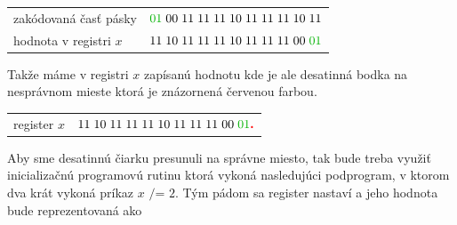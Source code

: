 \documentclass[11pt,a4paper]{article}
\newcommand{\red}[1]{\textcolor{red}{#1}}
\newcommand{\green}[1]{\textcolor{OliveGreen}{#1}}
\begin{document}
\begin{center}
    \begin{tabular}{l|l}
        zakódovaná časť pásky  & $\green{01} \hspace{1mm} 00 \hspace{1mm} 11 \hspace{1mm} 11 \hspace{1mm} 11 \hspace{1mm} 10 \hspace{1mm} 11 \hspace{1mm} 11 \hspace{1mm} 11 \hspace{1mm} 10 \hspace{1mm} 11$\\
        hodnota v registri $x$ & $11 \hspace{1mm} 10 \hspace{1mm} 11 \hspace{1mm} 11 \hspace{1mm} 11 \hspace{1mm} 10 \hspace{1mm} 11 \hspace{1mm} 11 \hspace{1mm} 11 \hspace{1mm} 00 \hspace{1mm} \green{01}$
    \end{tabular}
\end{center}

Takže máme v registri $x$ zapísanú hodnotu kde je ale desatinná bodka na nesprávnom mieste ktorá je znázornená červenou farbou.

\begin{center}
    \begin{tabular}{r | l}
        register $x$ & $11 \hspace{1mm} 10 \hspace{1mm} 11 \hspace{1mm} 11 \hspace{1mm} 11 \hspace{1mm} 10 \hspace{1mm} 11 \hspace{1mm} 11 \hspace{1mm} 11 \hspace{1mm} 00 \hspace{1mm} \green{01} \red{\textbf{.}}$
    \end{tabular}
\end{center}

Aby sme desatinnú čiarku presunuli na správne miesto, tak bude treba využiť inicializačnú programovú rutinu ktorá vykoná nasledujúci podprogram, v ktorom dva krát vykoná príkaz $x \texttt{ /= } 2$. Tým pádom sa register nastaví a jeho hodnota bude reprezentovaná ako
\end{document}
